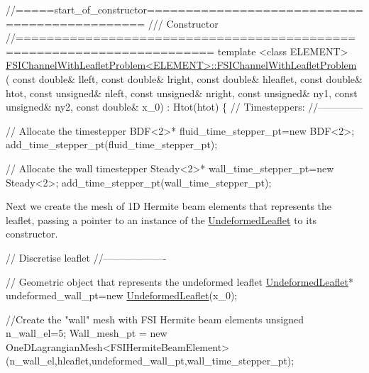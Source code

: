 \begin{DoxyCodeInclude}
\textcolor{comment}{//=====start\_of\_constructor==============================================}
\textcolor{comment}{/// Constructor}
\textcolor{comment}{}\textcolor{comment}{//=======================================================================}
\textcolor{keyword}{template} <\textcolor{keyword}{class} ELEMENT>
\hyperlink{classFSIChannelWithLeafletProblem_aaa0a455e91c4fb2dd9696607b802d01b}{FSIChannelWithLeafletProblem<ELEMENT>::FSIChannelWithLeafletProblem}
      (
 \textcolor{keyword}{const} \textcolor{keywordtype}{double}& lleft,
 \textcolor{keyword}{const} \textcolor{keywordtype}{double}& lright,
 \textcolor{keyword}{const} \textcolor{keywordtype}{double}& hleaflet,
 \textcolor{keyword}{const} \textcolor{keywordtype}{double}& htot,
 \textcolor{keyword}{const} \textcolor{keywordtype}{unsigned}& nleft,
 \textcolor{keyword}{const} \textcolor{keywordtype}{unsigned}& nright,
 \textcolor{keyword}{const} \textcolor{keywordtype}{unsigned}& ny1,
 \textcolor{keyword}{const} \textcolor{keywordtype}{unsigned}&  ny2,
 \textcolor{keyword}{const} \textcolor{keywordtype}{double}& x\_0) : Htot(htot)
\{
 \textcolor{comment}{// Timesteppers:}
 \textcolor{comment}{//--------------}

 \textcolor{comment}{// Allocate the timestepper}
 BDF<2>* fluid\_time\_stepper\_pt=\textcolor{keyword}{new} BDF<2>;
 add\_time\_stepper\_pt(fluid\_time\_stepper\_pt);

 \textcolor{comment}{// Allocate the wall timestepper}
 Steady<2>* wall\_time\_stepper\_pt=\textcolor{keyword}{new} Steady<2>;
 add\_time\_stepper\_pt(wall\_time\_stepper\_pt);

\end{DoxyCodeInclude}


Next we create the mesh of 1D Hermite beam elements that represents the leaflet, passing a pointer to an instance of the {\ttfamily \hyperlink{classUndeformedLeaflet}{Undeformed\+Leaflet}} to its constructor.


\begin{DoxyCodeInclude}


 \textcolor{comment}{// Discretise leaflet}
 \textcolor{comment}{//-------------------}

 \textcolor{comment}{// Geometric object that represents the undeformed leaflet}
 \hyperlink{classUndeformedLeaflet}{UndeformedLeaflet}* undeformed\_wall\_pt=\textcolor{keyword}{new} \hyperlink{classUndeformedLeaflet}{UndeformedLeaflet}(x\_0);

 \textcolor{comment}{//Create the "wall" mesh with FSI Hermite beam elements}
 \textcolor{keywordtype}{unsigned} n\_wall\_el=5;
 Wall\_mesh\_pt = \textcolor{keyword}{new} OneDLagrangianMesh<FSIHermiteBeamElement>
  (n\_wall\_el,hleaflet,undeformed\_wall\_pt,wall\_time\_stepper\_pt);

\end{DoxyCodeInclude}


